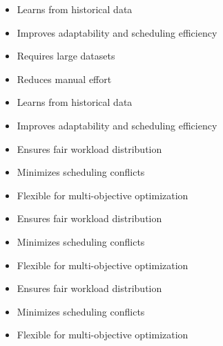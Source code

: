 \documentclass[a4paper, 12pt]{report}
\begin{document}
\begin{itemize}
    \item Learns from historical data
     \item Improves adaptability and scheduling efficiency
    \item Requires large datasets
    \item Reduces manual effort
     \item Learns from historical data
    \item Improves adaptability and scheduling efficiency
     \item Ensures fair workload distribution
    \item Minimizes scheduling conflicts
    \item Flexible for multi-objective optimization
     \item Ensures fair workload distribution
    \item Minimizes scheduling conflicts
    \item Flexible for multi-objective optimization
     \item Ensures fair workload distribution
    \item Minimizes scheduling conflicts
    \item Flexible for multi-objective optimization
\end{itemize}
\end{document}

